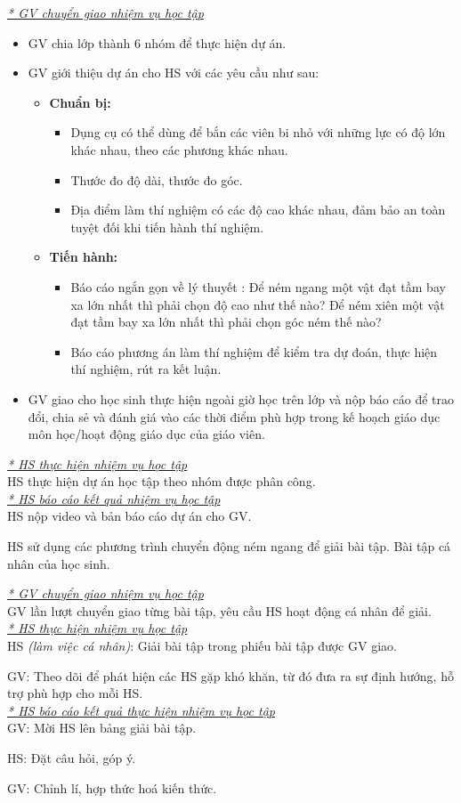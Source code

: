{\textit{\underline{* GV chuyển giao nhiệm vụ học tập}}
	\begin{itemize}[label=-]
		\item GV chia lớp thành 6 nhóm để thực hiện dự án.
		\item GV giới thiệu dự án cho HS với các yêu cầu như sau:
		\begin{itemize}
			\item \textbf{Chuẩn bị:}
			\begin{itemize}
				\item Dụng cụ có thể dùng để bắn các viên bi nhỏ với những lực có độ lớn khác nhau, theo các phương khác nhau.
				\item Thước đo độ dài, thước đo góc.
				\item Địa điểm làm thí nghiệm có các độ cao khác nhau, đảm bảo an toàn tuyệt đối khi tiến hành thí nghiệm.
			\end{itemize}
			\item \textbf{Tiến hành:}
			\begin{itemize}
				\item Báo cáo ngắn gọn về lý thuyết : Để ném ngang một vật đạt tầm bay xa lớn nhất thì phải chọn độ cao như thế nào? Để ném xiên một vật đạt tầm bay xa lớn nhất thì phải chọn góc ném thế nào?
				\item Báo cáo phương án làm thí nghiệm để kiểm tra dự đoán, thực hiện thí nghiệm, rút ra kết luận.
			\end{itemize}
		\end{itemize}
		\item GV giao cho học sinh thực hiện ngoài giờ học trên lớp và nộp báo cáo để trao đổi, chia sẻ và đánh giá vào các thời điểm phù hợp trong kế hoạch giáo dục môn học/hoạt động giáo dục của giáo viên.
	\end{itemize}
	\textit{\underline{* HS thực hiện nhiệm vụ học tập}}\\
	HS thực hiện dự án học tập theo nhóm được phân công.\\
	\textit{\underline{* HS báo cáo kết quả nhiệm vụ học tập}}\\
	HS nộp video và bản báo cáo dự án cho GV.
}
{
	HS sử dụng các phương trình chuyển động ném ngang để giải bài tập.
}
{
	Bài tập cá nhân của học sinh.
}
{
	\textit{\underline{* GV chuyển giao nhiệm vụ học tập}}\\
	GV lần lượt chuyển giao từng bài tập, yêu cầu HS hoạt động cá nhân để giải.\\
	\textit{\underline{* HS thực hiện nhiệm vụ học tập}}\\
	HS \textit{(làm việc cá nhân)}:  Giải bài tập trong phiếu bài tập được GV giao. 
	
	GV: Theo dõi để phát hiện các HS gặp khó khăn, từ đó đưa ra sự định hướng, hỗ trợ phù hợp cho mỗi HS.\\
	\textit{\underline{* HS báo cáo kết quả thực hiện nhiệm vụ học tập}}\\
	GV: Mời HS lên bảng giải bài tập.
	
	HS: Đặt câu hỏi, góp ý.
	
	GV: Chỉnh lí, hợp thức hoá kiến thức.
}
